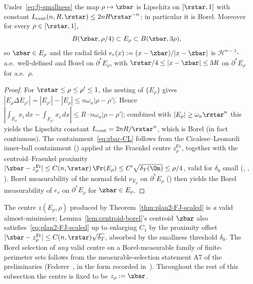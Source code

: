 \begin{lemma}
\label{lem:centroid-borel}
Under~\eqref{eq:fj-smallness} the map $\rho\mapsto\zbar$ is Lipschitz on
$[\rstar,1]$ with constant $L_{\mathrm{cent}}(n,R,\rstar)\le 2nR\rstar^{-n}$;
in particular it is Borel. Moreover for every $\rho\in[\rstar,1]$,
\begin{equation}\label{eq:zbar-CL}
   B(\zbar,\rho/4)\subset E_\rho\subset B(\zbar,3\rho),
\end{equation}
so $\zbar\in E_\rho$ and the radial field $e_r(x):=(x-\zbar)/|x-\zbar|$ is
$\mathcal H^{n-1}$-a.e.\ well-defined and Borel on $\partial^*E_\rho$, with
$\rstar/4\le|x-\zbar|\le 3R$ on $\partial^*E_\rho$ for a.e.\ $\rho$.
\end{lemma}

\begin{proof}
For $\rstar\le\rho\le\rho'\le1$, the nesting of $\{E_\rho\}$ gives
$|E_\rho\Delta E_{\rho'}|=|E_{\rho'}|-|E_\rho|\le n\omega_n|\rho-\rho'|$.
Hence
$|\int_{E_\rho}x_i\,dx-\int_{E_{\rho'}}x_i\,dx|\le R\cdot n\omega_n|\rho-\rho'|$;
combined with $|E_\rho|\ge\omega_n\rstar^n$ this yields the Lipschitz
constant $L_{\mathrm{cent}}=2nR/\rstar^n$, which is Borel (in fact
continuous). The containment~\eqref{eq:zbar-CL} follows from the
Cicalese--Leonardi inner-ball containment (\cite[Thm.\ 1.1]{CL2012})
applied at the Fraenkel centre
$z^{\mathrm{Fr}}_\rho$, together with the centroid--Fraenkel proximity
$|\zbar-z^{\mathrm{Fr}}_\rho|\le C(n,\rstar)\,\Fr(E_\rho)\le
C'\sqrt{\delta_T(\Om)}\le\rho/4$, valid for $\delta_0$ small
(\cite[Prop.\ 2.3]{CL2012},
\cite[Lem.\ 2.6]{AFM2013}, \cite[Thm.~1.1]{FJ2014}).
Borel measurability of the normal field $\nu_{E_\rho}$ on $\partial^*E_\rho$
(\cite[Thm.\ 15.9]{Maggi2012}) then yields the Borel measurability of
$e_r$ on $\partial^*E_\rho$ for $\zbar\in E_\rho$.
\end{proof}

\begin{remark}
\label{rmk:centre-selection}
The centre $z(E_\rho,\rho)$ produced by Theorem~\ref{thm:plan2-FJ-scaled} is
\emph{a} valid almost-minimiser; Lemma~\ref{lem:centroid-borel}'s centroid
$\zbar$ also satisfies~\eqref{eq:plan2-FJ-scaled} up to enlarging $C_1$ by the
proximity offset $|\zbar-z^{\mathrm{Fr}}_\rho|\le C(n,\rstar)\sqrt{\delta_T}$,
absorbed by the smallness threshold $\delta_0$. The Borel selection
of \emph{any} valid centre on a Borel-measurable family of finite-perimeter
sets follows from the measurable-selection statement A7 of the
preliminaries (Federer~\cite[\S2.13]{Federer1969}, in the form recorded
in~\cite[\S5.3]{AFP2000}). Throughout the rest of this subsection the
centre is fixed to be $z_\rho:=\zbar$.
\end{remark}

